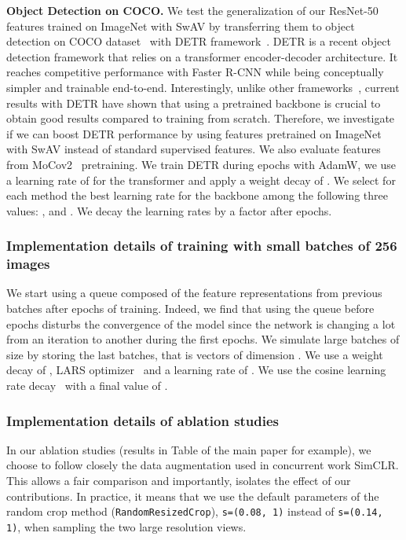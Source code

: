 \documentclass{article}
\def\OURS{SwAV\xspace}
\newcommand{\ImNet}{ImageNet\xspace}
\begin{document}
\par \noindent \textbf{Object Detection on COCO.}
We test the generalization of our ResNet-50 features trained on \ImNet with \OURS by transferring them to object detection on COCO dataset~\cite{lin2014microsoft} with DETR framework~\cite{carion2020end}.
DETR is a recent object detection framework that relies on a transformer encoder-decoder architecture.
It reaches competitive performance with Faster R-CNN while being conceptually simpler and trainable end-to-end.
Interestingly, unlike other frameworks~\cite{he2019rethinking}, current results with DETR have shown that using a pretrained backbone is crucial to obtain good results compared to training from scratch.
Therefore, we investigate if we can boost DETR performance by using features pretrained on ImageNet with \OURS instead of standard supervised features.
We also evaluate features from MoCov2~\cite{chen2020improved} pretraining.
We train DETR during  epochs with AdamW, we use a learning rate of  for the transformer and apply a weight decay of .
We select for each method the best learning rate for the backbone among the following three values: ,  and .
We decay the learning rates by a factor  after  epochs.

\subsubsection{Implementation details of training with small batches of 256 images}
We start using a queue composed of the feature representations from previous batches after  epochs of training.
Indeed, we find that using the queue before  epochs disturbs the convergence of the model since the network is changing a lot from an iteration to another during the first epochs.
We simulate large batches of size  by storing the last  batches, that is  vectors of dimension .
We use a weight decay of , LARS optimizer~\cite{you2017large} and a learning rate of .
We use the cosine learning rate decay~\cite{loshchilov2016sgdr} with a final value of .

\subsubsection{Implementation details of ablation studies}
In our ablation studies (results in Table  of the main paper for example), we choose to follow closely the data augmentation used in concurrent work SimCLR.
This allows a fair comparison and importantly, isolates the effect of our contributions.
In practice, it means that we use the default parameters of the random crop method (\texttt{RandomResizedCrop}), \texttt{s=(0.08, 1)} instead of \texttt{s=(0.14, 1)}, when sampling the two large resolution views.
\end{document}
